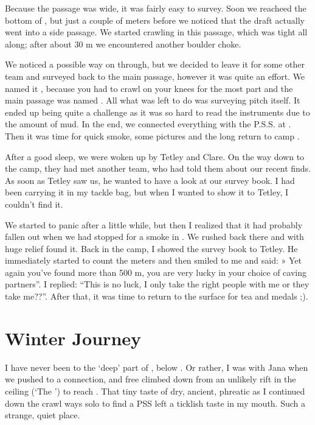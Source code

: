 Because the passage was wide, it was fairly easy to survey. Soon we
reacheed the bottom of , but just a couple of
meters before we noticed that the draft actually went into a side
passage. We started crawling in this passage, which was tight all along;
after about 30 m we encountered another boulder choke.

We noticed a possible way on through, but we decided to leave it for
some other team and surveyed back to the main passage, however it was
quite an effort. We named it , because you had to crawl
on your knees for the most part and the main passage was named
. All what was left to do was surveying  pitch itself. It ended up being quite a challenge as it was so
hard to read the instruments due to the amount of mud. In the end, we
connected everything with the P.S.S. at . Then it was
time for quick smoke, some pictures and the long return to camp
.

After a good sleep, we were woken up by Tetley and Clare. On the way
down to the camp, they had met another team, who had told them about our
recent finds. As soon as Tetley saw us, he wanted to have a look at our
survey book. I had been carrying it in my tackle bag, but when I wanted
to show it to Tetley, I couldn't find it.

We started to panic after a little while, but then I realized that it
had probably fallen out when we had stopped for a smoke in . We rushed back there and with huge relief found it. Back in the
camp, I showed the survey book to Tetley. He immediately started to
count the meters and then smiled to me and said: » Yet again you've
found more than 500 m, you are very lucky in your choice of caving
partners''. I replied: ``This is no luck, I only take the right people
with me or they take me??''. After that, it was time to return to the
surface for tea and medals ;).



\section{Winter Journey}

I have never been to the `deep' part of , below
. Or rather, I was with Jana when we
pushed  to a connection, and free climbed down from an unlikely
rift in the ceiling (`The ') to reach . That tiny taste
of dry, ancient, phreatic as I continued down the crawl ways solo to
find a PSS left a ticklish taste in my mouth. Such a strange, quiet
place.

